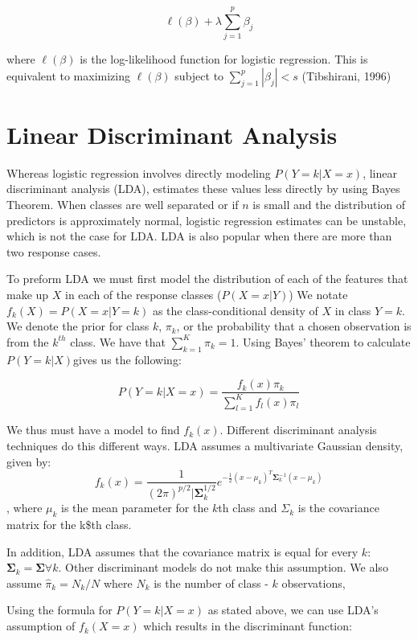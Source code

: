 \documentclass[12pt,twoside]{reedthesis}
\theoremstyle{definition}
\theoremstyle{definition}
\theoremstyle{definition}
\theoremstyle{remark}
\begin{document}
\[ \ell(\beta) + \lambda \sum_{j = 1}^p \beta_j \]

where \(\ell(\beta)\) is the log-likelihood function for logistic
regression. This is equivalent to maximizing \(\ell(\beta)\) subject to
\(\sum_{j=1}^p|\beta_j| < s\) (Tibshirani, 1996)

\section{Linear Discriminant
Analysis}\label{linear-discriminant-analysis}

Whereas logistic regression involves directly modeling
\(P(Y = k | X =x)\), linear discriminant analysis (LDA), estimates these
values less directly by using Bayes Theorem. When classes are well
separated or if \(n\) is small and the distribution of predictors is
approximately normal, logistic regression estimates can be unstable,
which is not the case for LDA. LDA is also popular when there are more
than two response cases.

To preform LDA we must first model the distribution of each of the
features that make up \(X\) in each of the response classes
(\(P(X = x|Y)\)) We notate \(f_k(X) = P(X = x| Y = k)\) as the
class-conditional density of \(X\) in class \(Y = k\). We denote the
prior for class \(k\), \(\pi_k\), or the probability that a chosen
observation is from the \(k^{th}\) class. We have that
\(\sum_{k=1}^K \pi_k = 1\). Using Bayes' theorem to calculate
\(P(Y = k |X)\)gives us the following:

\[ P(Y = k | X = x) = \frac{f_k(x)\pi_k}{\sum_{l = 1}^Kf_l(x)\pi_l}\]

We thus must have a model to find \(f_k(x)\). Different discriminant
analysis techniques do this different ways. LDA assumes a multivariate
Gaussian density, given by:
\[f_k(x) = \frac{1}{(2\pi)^{p/2}|\mathbf{\Sigma}_k^{1/2}}e^{-\frac{1}{2}(x-\mu_k)^T\mathbf{\Sigma}_k^{-1}(x - \mu_k)}\]
, where \(\mu_k\) is the mean parameter for the \(k\)th class and
\(\Sigma_k\) is the covariance matrix for the k\$th class.

In addition, LDA assumes that the covariance matrix is equal for every
\(k\): \(\mathbf{\Sigma}_k = \mathbf{\Sigma} \forall k\). Other
discriminant models do not make this assumption. We also assume
\(\hat{\pi}_k = N_k/N\) where \(N_k\) is the number of class - \(k\)
observations,

Using the formula for \(P(Y = k|X=x)\) as stated above, we can use LDA's
assumption of \(f_k(X = x)\) which results in the discriminant function:
\end{document}
